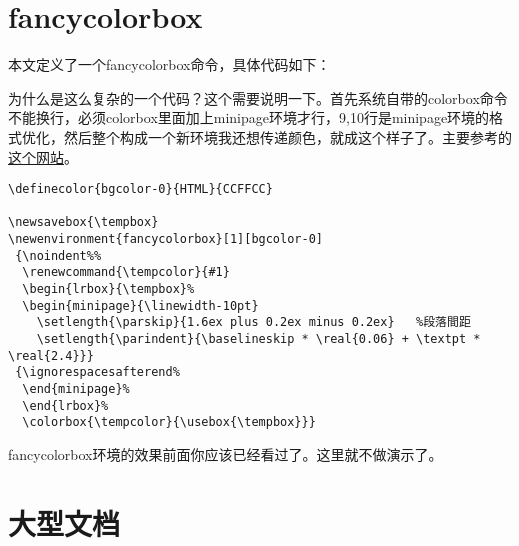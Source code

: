 \section{fancycolorbox}
本文定义了一个fancycolorbox命令，具体代码如下：\\
\begin{fancycolorbox}
为什么是这么复杂的一个代码？这个需要说明一下。首先系统自带的colorbox命令不能换行，必须colorbox里面加上minipage环境才行，9,10行是minipage环境的格式优化，然后整个构成一个新环境我还想传递颜色，就成这个样子了。主要参考的\href{http://tex.stackexchange.com/questions/127612/color-text-and-bg-of-verbatim-without-affecting-fancyvrb-line-numbers}{这个网站}。
\end{fancycolorbox}
\vspace{20pt}
\begin{verbatim}
\definecolor{bgcolor-0}{HTML}{CCFFCC} 

\newsavebox{\tempbox}
\newenvironment{fancycolorbox}[1][bgcolor-0]
 {\noindent%%
  \renewcommand{\tempcolor}{#1}
  \begin{lrbox}{\tempbox}%
  \begin{minipage}{\linewidth-10pt}
  	\setlength{\parskip}{1.6ex plus 0.2ex minus 0.2ex}   %段落間距
	\setlength{\parindent}{\baselineskip * \real{0.06} + \textpt * \real{2.4}}}  	
 {\ignorespacesafterend%
  \end{minipage}%
  \end{lrbox}%
  \colorbox{\tempcolor}{\usebox{\tempbox}}}  
\end{verbatim}
fancycolorbox环境的效果前面你应该已经看过了。这里就不做演示了。


\section{大型文档}

